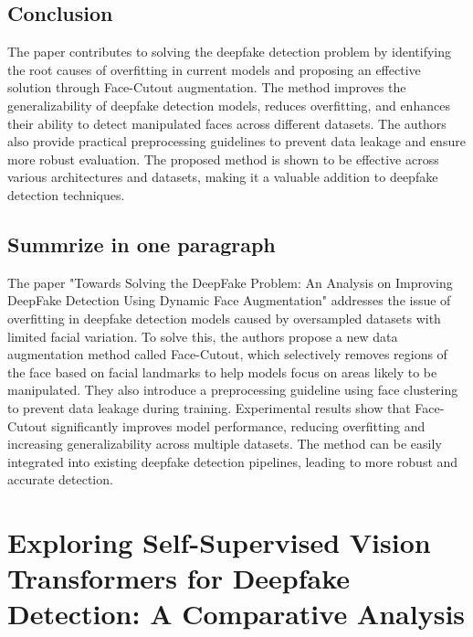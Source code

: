 \documentclass{report}
\begin{document}
	\section{Conclusion}
	The paper contributes to solving the deepfake detection problem by identifying the root causes of overfitting in current models and proposing an effective solution through Face-Cutout augmentation. The method improves the generalizability of deepfake detection models, reduces overfitting, and enhances their ability to detect manipulated faces across different datasets. The authors also provide practical preprocessing guidelines to prevent data leakage and ensure more robust evaluation. The proposed method is shown to be effective across various architectures and datasets, making it a valuable addition to deepfake detection techniques.
	
	
	\section{Summrize in one paragraph}
	The paper "Towards Solving the DeepFake Problem: An Analysis on Improving DeepFake Detection Using Dynamic Face Augmentation" addresses the issue of overfitting in deepfake detection models caused by oversampled datasets with limited facial variation. To solve this, the authors propose a new data augmentation method called Face-Cutout, which selectively removes regions of the face based on facial landmarks to help models focus on areas likely to be manipulated. They also introduce a preprocessing guideline using face clustering to prevent data leakage during training. Experimental results show that Face-Cutout significantly improves model performance, reducing overfitting and increasing generalizability across multiple datasets. The method can be easily integrated into existing deepfake detection pipelines, leading to more robust and accurate detection.
	
	
	
	
	
	
	
	
	
	
	\chapter{Exploring Self-Supervised Vision Transformers for Deepfake Detection: A Comparative Analysis \cite{nguyen2024exploringselfsupervisedvisiontransformers}}
	
\end{document}
